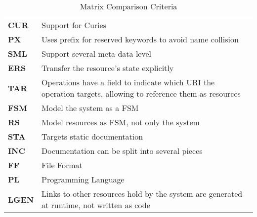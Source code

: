 \begin{table*}[ht]
\begin{tabular}{ |P{1.5cm}|p{8cm}| }
 \textbf{CUR} & Support for Curies \\
 \textbf{PX} & Uses prefix for reserved keywords to avoid name collision \\
 \textbf{SML} & Support several meta-data level \\
 \textbf{ERS} & Transfer the resource's state explicitly \\
 \textbf{TAR} & Operations have a field to indicate which URI the operation targets, allowing to reference them as resources \\
 \textbf{FSM} & Model the system as a FSM \\
 \textbf{RS} & Model resources as FSM, not only the system \\
 \textbf{STA} & Targets static documentation \\
 \textbf{INC} & Documentation can be split into several pieces \\
 \textbf{FF} & File Format \\
 \textbf{PL} & Programming Language \\
 \textbf{LGEN} & Links to other resources hold by the system are generated at runtime, not written as code \\
 \hline
\end{tabular}
\caption{Matrix Comparison Criteria}
\label{criteria}
\end{table*}